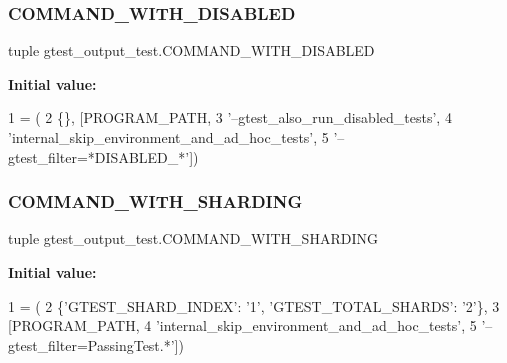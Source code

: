 \subsubsection{\texorpdfstring{C\+O\+M\+M\+A\+N\+D\+\_\+\+W\+I\+T\+H\+\_\+\+D\+I\+S\+A\+B\+L\+ED}{COMMAND\_WITH\_DISABLED}}
{\footnotesize\ttfamily tuple gtest\+\_\+output\+\_\+test.\+C\+O\+M\+M\+A\+N\+D\+\_\+\+W\+I\+T\+H\+\_\+\+D\+I\+S\+A\+B\+L\+ED}

{\bfseries Initial value\+:}
\begin{DoxyCode}
1 =  (
2     \{\}, [PROGRAM\_PATH,
3          \textcolor{stringliteral}{'--gtest\_also\_run\_disabled\_tests'},
4          \textcolor{stringliteral}{'internal\_skip\_environment\_and\_ad\_hoc\_tests'},
5          \textcolor{stringliteral}{'--gtest\_filter=*DISABLED\_*'}])
\end{DoxyCode}
\mbox{\label{namespacegtest__output__test_a462eef2a00782001d491b7a38a847bec}} 
\subsubsection{\texorpdfstring{C\+O\+M\+M\+A\+N\+D\+\_\+\+W\+I\+T\+H\+\_\+\+S\+H\+A\+R\+D\+I\+NG}{COMMAND\_WITH\_SHARDING}}
{\footnotesize\ttfamily tuple gtest\+\_\+output\+\_\+test.\+C\+O\+M\+M\+A\+N\+D\+\_\+\+W\+I\+T\+H\+\_\+\+S\+H\+A\+R\+D\+I\+NG}

{\bfseries Initial value\+:}
\begin{DoxyCode}
1 =  (
2     \{\textcolor{stringliteral}{'GTEST\_SHARD\_INDEX'}: \textcolor{stringliteral}{'1'}, \textcolor{stringliteral}{'GTEST\_TOTAL\_SHARDS'}: \textcolor{stringliteral}{'2'}\},
3     [PROGRAM\_PATH,
4      \textcolor{stringliteral}{'internal\_skip\_environment\_and\_ad\_hoc\_tests'},
5      \textcolor{stringliteral}{'--gtest\_filter=PassingTest.*'}])
\end{DoxyCode}
\mbox{\label{namespacegtest__output__test_a1c27d93a57990d21461436f2d5ff3064}} 
